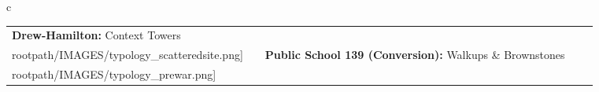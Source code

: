 \begin{table}[H]
        \begin{tabular}{c}
        \begin{tabular}{m{1.25in} m{2in} m{.1in} m{1.25in} m{2in}}
\textbf{Drew-Hamilton:} {Context Towers} & \texttt{[image: \\rootpath/IMAGES/typology\_scatteredsite.png]} & & \textbf{Public School 139 (Conversion):} {Walkups \& Brownstones} & \texttt{[image: \\rootpath/IMAGES/typology\_prewar.png]}
\end{tabular}\end{tabular}
        \end{table}
